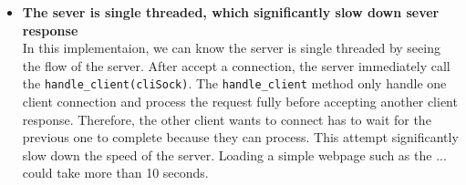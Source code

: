 \documentclass[11pt]{article}
\begin{document}
\begin{enumerate}
\begin{itemize}
				\item \textbf{The sever is single threaded, which significantly slow down sever response} \\
				In this implementaion, we can know the server is single threaded by seeing the flow of the server. After accept a connection, the server immediately call the \texttt{handle\_client(cliSock)}. The \texttt{handle\_client} method only handle one client connection and process the request fully before accepting another client response. Therefore, the other client wants to connect has to wait for the previous one to complete because they can process. This attempt significantly slow down the speed of the server. Loading a simple webpage such as the ... could take more than 10 seconds.\\
			\end{itemize}
		

\end{enumerate}
\end{document}
